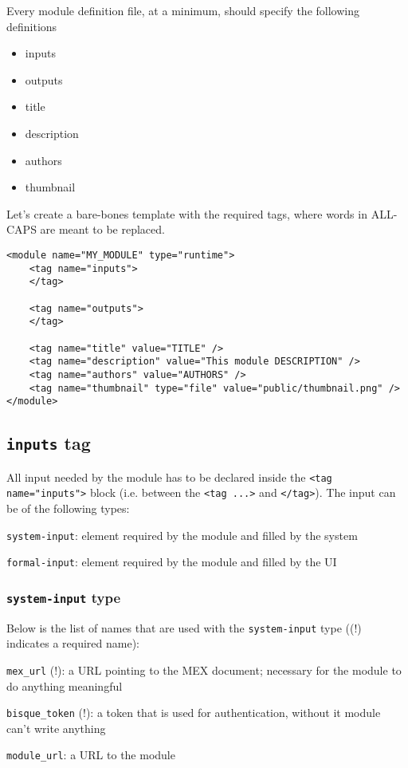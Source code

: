 Every module definition file, at a minimum, should specify the following definitions
\begin{itemize}
\setlength{\itemsep}{0.1mm}
\item inputs
\item outputs
\item title
\item description
\item authors
\item thumbnail
\end{itemize}

Let's create a bare-bones template with the required tags, where words in ALL-CAPS are meant to be replaced.
\begin{verbatim}
<module name="MY_MODULE" type="runtime">
    <tag name="inputs">
    </tag>
    
    <tag name="outputs">
    </tag>

    <tag name="title" value="TITLE" />     
    <tag name="description" value="This module DESCRIPTION" />
    <tag name="authors" value="AUTHORS" /> 
    <tag name="thumbnail" type="file" value="public/thumbnail.png" />
</module>
\end{verbatim}


\subsection{\texttt{inputs} tag}
All input needed by the module has to be declared inside the 
\texttt{<tag name="inputs">}  block (i.e. between the \texttt{<tag ...>} and \texttt{</tag>}). The input can be of the following types:
\begin{itemize*}
\item 
\texttt{system-input}: element required by the module and filled by the system
\item 
\texttt{formal-input}: element required by the module and filled by the UI
\end{itemize*}


\subsubsection{\texttt{system-input} type}
Below is the list of names that are used with the \texttt{system-input} type ((!) indicates a required name):
\begin{itemize*}
\item 
\texttt{mex\_url} (!): a URL pointing to the MEX document; necessary for the module to do anything meaningful
\item 
\texttt{bisque\_token} (!): a token that is used for authentication, without it module can't write anything
\item
\texttt{module\_url}:  a URL to the module %
\end{itemize*}

